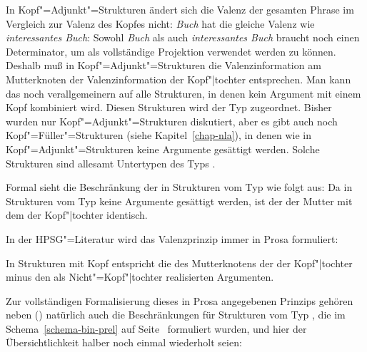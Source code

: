 In Kopf"=Adjunkt"=Strukturen ändert sich die Valenz der gesamten Phrase im Vergleich
zur Valenz des Kopfes nicht: \emph{Buch} hat die gleiche Valenz wie \emph{interessantes Buch}:
Sowohl \emph{Buch} als auch \emph{interessantes Buch} braucht noch einen Determinator, um als
vollständige Projektion verwendet werden zu können.
Deshalb muß in Kopf"=Adjunkt"=Strukturen die Valenzinformation am Mutterknoten der Valenzinformation 
der Kopf"|tochter entsprechen. Man kann das noch verallgemeinern auf alle Strukturen, in denen
kein Argument mit einem Kopf kombiniert wird. Diesen Strukturen wird der Typ 
zugeordnet. Bisher wurden nur Kopf"=Adjunkt"=Strukturen diskutiert, aber es gibt \zb auch
noch Kopf"=Füller"=Strukturen (siehe Kapitel~\ref{chap-nla}), in denen wie in Kopf"=Adjunkt"=Strukturen
keine Argumente gesättigt werden. Solche Strukturen sind allesamt Untertypen des Typs .

Formal sieht die Beschränkung der \subcatwe in Strukturen vom Typ 
wie folgt aus:
\ea
\label{def-head-non-arg-phrase}
 \impl
{}
\z
Da in Strukturen vom Typ 
keine Argumente gesättigt werden, ist der \subcatw der Mutter mit dem der Kopf"|tochter identisch.

In der HPSG"=Literatur wird das Valenzprinzip immer in Prosa formuliert:

\begin{prinzip-break}[Valenzprinzip]
In Strukturen mit Kopf entspricht die \subcatl des Mutterknotens der \subcatl der Kopf"|tochter
minus den als Nicht"=Kopf"|tochter realisierten Argumenten.
\end{prinzip-break}

\noindent
Zur vollständigen Formalisierung dieses in Prosa angegebenen Prinzips gehören neben ()
natürlich auch die Beschränkungen für Strukturen vom Typ , die im
Schema~\ref{schema-bin-prel} auf Seite~\pageref{schema-bin-prel} formuliert wurden, und hier der
Übersichtlichkeit halber noch einmal wiederholt seien:
\ea
{} \impl\\
\z

